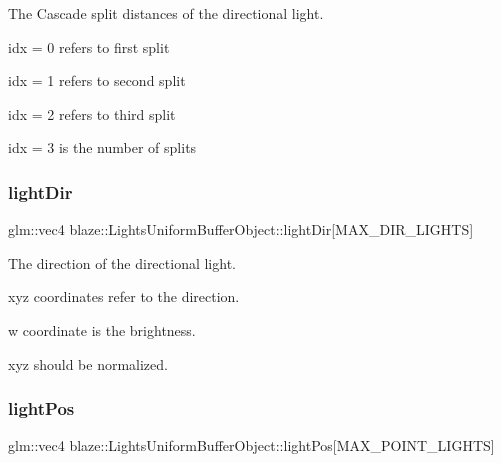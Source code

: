 The Cascade split distances of the directional light. 

\begin{DoxyItemize}
\item idx = 0 refers to first split \item idx = 1 refers to second split \item idx = 2 refers to third split \item idx = 3 is the number of splits \end{DoxyItemize}
\mbox{\label{structblaze_1_1LightsUniformBufferObject_a2ebec5884a12f8554de270b8c71ee7d9}} 
\subsubsection{\texorpdfstring{light\+Dir}{lightDir}}
{\footnotesize\ttfamily glm\+::vec4 blaze\+::\+Lights\+Uniform\+Buffer\+Object\+::light\+Dir\mbox{[}M\+A\+X\+\_\+\+D\+I\+R\+\_\+\+L\+I\+G\+H\+TS\mbox{]}}



The direction of the directional light. 

\begin{DoxyItemize}
\item xyz coordinates refer to the direction. \item w coordinate is the brightness. \item xyz should be normalized. \end{DoxyItemize}
\mbox{\label{structblaze_1_1LightsUniformBufferObject_af1ad7c6e501ff86a3e1e537231a34c26}} 
\subsubsection{\texorpdfstring{light\+Pos}{lightPos}}
{\footnotesize\ttfamily glm\+::vec4 blaze\+::\+Lights\+Uniform\+Buffer\+Object\+::light\+Pos\mbox{[}M\+A\+X\+\_\+\+P\+O\+I\+N\+T\+\_\+\+L\+I\+G\+H\+TS\mbox{]}}



